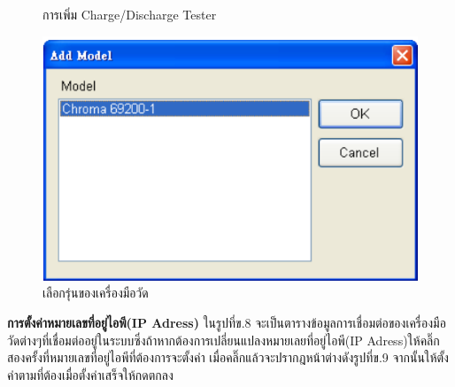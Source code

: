 \begin{center}
\begin{figure}[H]
			\centering
			\captionsetup{justification=centering,margin=2cm}
			\caption{การเพิ่ม Charge/Discharge Tester}
	\end{figure}
	\begin{figure}[H]
		\includegraphics[width=1\linewidth]{Chapters/img/17020_Program/HW_Configulation/Add_Model.png}
			\centering
			\captionsetup{justification=centering,margin=2cm}
			\caption{เลือกรุ่นของเครื่องมือวัด}
	\end{figure}
\end{center}
\textbf{การตั้งค่าหมายเลขที่อยู่ไอพี(IP Adress)}
\newline \hspace*{2cm}
ในรูปที่ข.8 จะเป็นตารางข้อมูลการเชื่อมต่อของเครื่องมือวัดต่างๆที่เชื่อมต่ออยู่ในระบบซึ่งถ้าหากต้องการเปลี่ยนแปลงหมายเลยที่อยู่ไอพี(IP Adress)ให้คลิ๊กสองครั้งที่หมายเลขที่อยู่ไอพีที่ต้องการจะตั้งค่า
เมื่อคลิ๊กแล้วจะปรากฎหน้าต่างดังรูปที่ข.9 จากนั้นให้ตั้งค่าตามที่ต้องเมื่อตั้งค่าเสร็จให้กดตกลง
